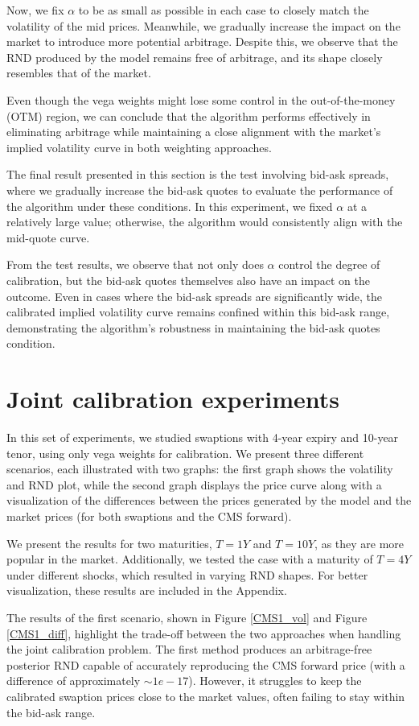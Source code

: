 Now, we fix \(\alpha\) to be as small as possible in each case to closely match the volatility of the mid prices. 
Meanwhile, we gradually increase the impact on the market to introduce more potential arbitrage. 
Despite this, we observe that the RND produced by the model remains free of arbitrage, 
and its shape closely resembles that of the market.

Even though the vega weights might lose some control in the out-of-the-money (OTM) region, 
we can conclude that the algorithm performs effectively in eliminating arbitrage while maintaining a close 
alignment with the market's implied volatility curve in both weighting approaches.

The final result presented in this section is the test involving bid-ask spreads, where we gradually increase the bid-ask quotes 
to evaluate the performance of the algorithm under these conditions. 
In this experiment, we fixed \(\alpha\) at a relatively large value; otherwise, the algorithm would consistently align with the 
mid-quote curve.

From the test results, we observe that not only does \(\alpha\) control the degree of calibration, but the bid-ask quotes themselves 
also have an impact on the outcome. Even in cases where the bid-ask spreads are significantly wide, 
the calibrated implied volatility curve remains confined within this bid-ask range, demonstrating the algorithm's robustness in 
maintaining the bid-ask quotes condition.

\section{Joint calibration experiments}
In this set of experiments, we studied swaptions with 4-year expiry and 10-year tenor, using only vega weights for calibration. 
We present three different scenarios, each illustrated with two graphs: the first graph shows the volatility and RND plot, 
while the second graph displays the price curve along with a visualization of the differences between the prices generated by the model 
and the market prices (for both swaptions and the CMS forward).

We present the results for two maturities, \(T = 1Y\) and \(T = 10Y\), 
as they are more popular in the market. 
Additionally, we tested the case with a maturity of \(T = 4Y\) under different shocks, 
which resulted in varying RND shapes. For better visualization, these results are included in the Appendix.


The results of the first scenario, shown in Figure \ref{CMS1_vol} and Figure \ref{CMS1_diff}, 
highlight the trade-off between the two approaches when handling the joint calibration problem. 
The first method produces an arbitrage-free posterior RND capable of accurately reproducing the CMS forward price 
(with a difference of approximately \( \sim 1e-17 \)). However, it struggles to keep the calibrated swaption prices close to the market values, 
often failing to stay within the bid-ask range. 

